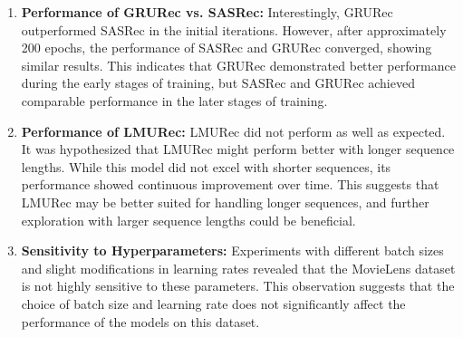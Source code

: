 \documentclass{article}
\begin{document}
\begin{enumerate}
    \item \textbf{Performance of GRURec vs. SASRec:} Interestingly, GRURec outperformed SASRec in the initial iterations. However, after approximately 200 epochs, the performance of SASRec and GRURec converged, showing similar results. This indicates that GRURec demonstrated better performance during the early stages of training, but SASRec and GRURec achieved comparable performance in the later stages of training.

    \item \textbf{Performance of LMURec:} LMURec did not perform as well as expected. It was hypothesized that LMURec might perform better with longer sequence lengths. While this model did not excel with shorter sequences, its performance showed continuous improvement over time. This suggests that LMURec may be better suited for handling longer sequences, and further exploration with larger sequence lengths could be beneficial.

    \item \textbf{Sensitivity to Hyperparameters:} Experiments with different batch sizes and slight modifications in learning rates revealed that the MovieLens dataset is not highly sensitive to these parameters. This observation suggests that the choice of batch size and learning rate does not significantly affect the performance of the models on this dataset.
\end{enumerate}
\end{document}
